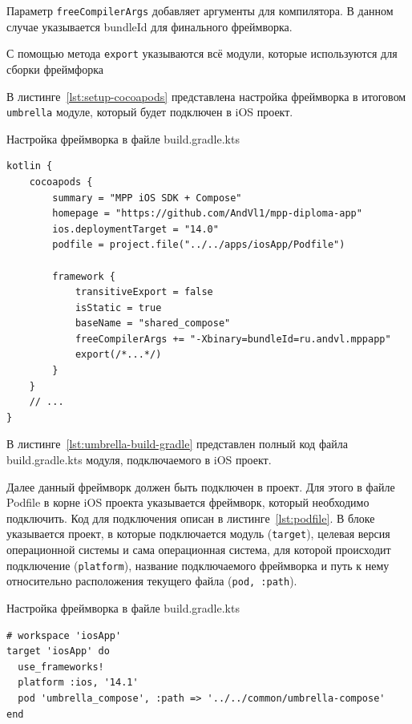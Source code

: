 \documentclass[14pt, russian]{scrartcl}
\begin{document}
Параметр \texttt{freeCompilerArgs} добавляет аргументы для компилятора. В данном случае указывается bundleId для финального фреймворка.

С помощью метода \texttt{export} указываются всё модули, которые используются для сборки фреймфорка

В листинге~\ref{lst:setup-cocoapods} представлена настройка фреймворка в итоговом \texttt{umbrella} модуле, который будет подключен в iOS проект.

\begin{listing}[!htb]
\caption{Настройка фреймворка в файле build.gradle.kts}
\label{lst:setup-cocoapods}
\begin{verbatim}
kotlin {
    cocoapods {
        summary = "MPP iOS SDK + Compose"
        homepage = "https://github.com/AndVl1/mpp-diploma-app"
        ios.deploymentTarget = "14.0"
        podfile = project.file("../../apps/iosApp/Podfile")

        framework {
            transitiveExport = false
            isStatic = true
            baseName = "shared_compose"
            freeCompilerArgs += "-Xbinary=bundleId=ru.andvl.mppapp"
            export(/*...*/)
        }
    }
    // ...
}
\end{verbatim}
\end{listing}

В листинге~\ref{lst:umbrella-build-gradle} представлен полный код файла build.gradle.kts модуля, подключаемого в iOS проект.

Далее данный фреймворк должен быть подключен в проект. Для этого в файле Podfile в корне iOS проекта указывается фреймворк, который необходимо подключить. Код для подключения описан в листинге~\ref{lst:podfile}. В блоке указывается проект, в которые подключается модуль (\texttt{target}), целевая версия операционной системы и сама операционная система, для которой происходит подключение (\texttt{platform}), название подключаемого фреймворка и путь к нему относительно расположения текущего файла (\texttt{pod, :path}).

\begin{listing}[!htb]
\caption{Настройка фреймворка в файле build.gradle.kts}
\label{lst:podfile}
\begin{verbatim}
# workspace 'iosApp'
target 'iosApp' do
  use_frameworks!
  platform :ios, '14.1'
  pod 'umbrella_compose', :path => '../../common/umbrella-compose'
end
\end{verbatim}
\end{listing}
\end{document}
